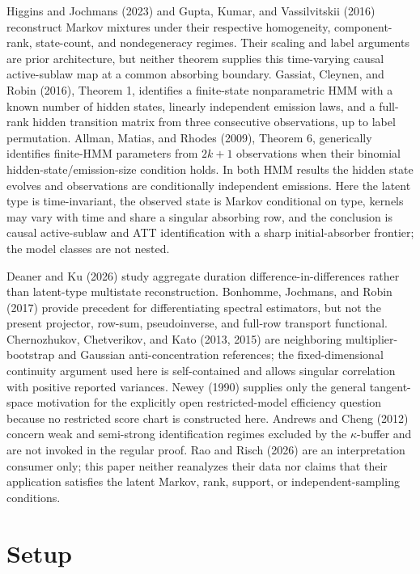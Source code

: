 \documentclass{article}
\begin{document}
Higgins and Jochmans (2023) and Gupta, Kumar, and Vassilvitskii (2016) reconstruct Markov mixtures under their respective homogeneity, component-rank, state-count, and nondegeneracy regimes.  Their scaling and label arguments are prior architecture, but neither theorem supplies this time-varying causal active-sublaw map at a common absorbing boundary.  Gassiat, Cleynen, and Robin (2016), Theorem 1, identifies a finite-state nonparametric HMM with a known number of hidden states, linearly independent emission laws, and a full-rank hidden transition matrix from three consecutive observations, up to label permutation.  Allman, Matias, and Rhodes (2009), Theorem 6, generically identifies finite-HMM parameters from \(2k+1\) observations when their binomial hidden-state/emission-size condition holds.  In both HMM results the hidden state evolves and observations are conditionally independent emissions.  Here the latent type is time-invariant, the observed state is Markov conditional on type, kernels may vary with time and share a singular absorbing row, and the conclusion is causal active-sublaw and ATT identification with a sharp initial-absorber frontier; the model classes are not nested.

Deaner and Ku (2026) study aggregate duration difference-in-differences rather than latent-type multistate reconstruction.  Bonhomme, Jochmans, and Robin (2017) provide precedent for differentiating spectral estimators, but not the present projector, row-sum, pseudoinverse, and full-row transport functional.  Chernozhukov, Chetverikov, and Kato (2013, 2015) are neighboring multiplier-bootstrap and Gaussian anti-concentration references; the fixed-dimensional continuity argument used here is self-contained and allows singular correlation with positive reported variances.  Newey (1990) supplies only the general tangent-space motivation for the explicitly open restricted-model efficiency question because no restricted score chart is constructed here.  Andrews and Cheng (2012) concern weak and semi-strong identification regimes excluded by the \(\kappa\)-buffer and are not invoked in the regular proof.  Rao and Risch (2026) are an interpretation consumer only; this paper neither reanalyzes their data nor claims that their application satisfies the latent Markov, rank, support, or independent-sampling conditions.

\section{Setup}
\end{document}
